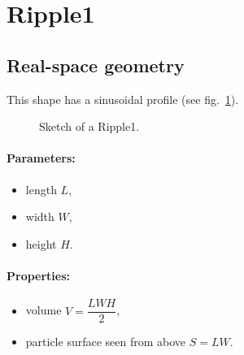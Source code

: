 \section{Ripple1}   

\subsection{Real-space geometry}
This shape has a sinusoidal profile (see fig.~\ref{fig:ripple1}).

\begin{figure}[ht]
\hfill
{}
\hfill
{}
\hfill
\caption{Sketch of a Ripple1.}
\label{fig:ripple1}
\end{figure}

\paragraph{Parameters:}
\begin{itemize}
\item length $L$, 
\item width $W$, 
\item height $H$. 
\end{itemize}

\paragraph{Properties:}
\begin{itemize}
\item volume $V = \dfrac{L W H}{2} $,
\item particle surface seen from above $S = L W$.
\end{itemize}

